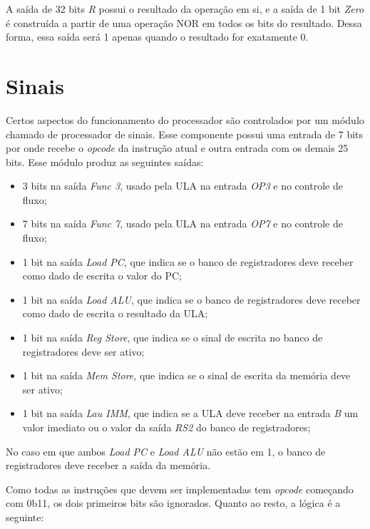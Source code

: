\documentclass[twocolumn]{article}
\newcommand{\circuit}[1]{}
\begin{document}
A saída de 32 bits \textit{R} possui o resultado da operação em si, e a saída de
1 bit \textit{Zero} é construída a partir de uma operação NOR em todos os bits
do resultado. Dessa forma, essa saída será 1 apenas quando o resultado for
exatamente 0.

\section{Sinais}

Certos aspectos do funcionamento do processador são controlados por um módulo
chamado de processador de sinais. Esse componente possui uma entrada de 7 bits
por onde recebe o \textit{opcode} da instrução atual e outra entrada com os
demais 25 bits. Esse módulo produz as seguintes saídas:

\circuit{signal-proc}

\begin{itemize}
\item 3 bits na saída \textit{Func 3}, usado pela ULA na entrada \textit{OP3} e
  no controle de fluxo;
\item 7 bits na saída \textit{Func 7}, usado pela ULA na entrada \textit{OP7} e
  no controle de fluxo;
\item 1 bit na saída \textit{Load PC}, que indica se o banco de registradores
  deve receber como dado de escrita o valor do PC;
\item 1 bit na saída \textit{Load ALU}, que indica se o banco de registradores
  deve receber como dado de escrita o resultado da ULA;
\item 1 bit na saída \textit{Reg Store}, que indica se o sinal de escrita no
  banco de registradores deve ser ativo;
\item 1 bit na saída \textit{Mem Store}, que indica se o sinal de escrita da
  memória deve ser ativo;
\item 1 bit na saída \textit{Lau IMM}, que indica se a ULA deve receber na
  entrada \textit{B} um valor imediato ou o valor da saída \textit{RS2} do banco
  de registradores;
\end{itemize}

No caso em que ambos \textit{Load PC} e \textit{Load ALU} não estão em 1, o
banco de registradores deve receber a saída da memória.

Como todas as instruções que devem ser implementadas tem \textit{opcode}
começando com 0b11, os dois primeiros bits são ignorados. Quanto ao resto, a
lógica é a seguinte:
\end{document}
